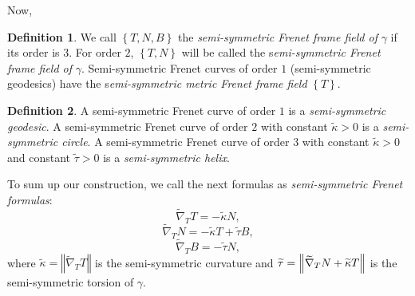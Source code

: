 \documentclass{amsart}
\theoremstyle{plain}
\theoremstyle{definition}
\newtheorem{definition}{Definition}
\theoremstyle{remark}
\numberwithin{equation}{section}
\begin{document}
Now,

\begin{definition}
We call $\left\{ T,N,B\right\} $ the \textit{semi-symmetric Frenet frame
field of} $\gamma $ if its order is $3$. For order $2$, $\left\{ T,N\right\} 
$ will be called the s\textit{emi-symmetric Frenet frame field of} $\gamma .$
Semi-symmetric Frenet curves of order $1$ (semi-symmetric geodesics) have
the s\textit{emi-symmetric metric Frenet frame field }$\left\{ T\right\} .$
\end{definition}

\begin{definition}
A semi-symmetric Frenet curve of order $1$ is a \textit{semi-symmetric
geodesic}. A semi-symmetric Frenet curve of order $2$ with constant $%
\widetilde{\kappa }>0$ is a \textit{semi-symmetric circle}. A semi-symmetric
Frenet curve of order $3$ with constant $\widetilde{\kappa }>0$ and constant 
$\widetilde{\tau }>0$ is a \textit{semi-symmetric helix}.
\end{definition}

To sum up our construction, we call the next formulas as \textit{%
semi-symmetric Frenet formulas}:%
\begin{equation*}
\widetilde{\nabla }_{T}T=-\widetilde{\kappa }N,
\end{equation*}%
\begin{equation*}
\widetilde{\nabla }_{T}N=-\widetilde{\kappa }T+\widetilde{\tau }B,
\end{equation*}%
\begin{equation*}
\widetilde{\nabla }_{T}B=-\widetilde{\tau }N,
\end{equation*}%
where $\widetilde{\kappa }=\left\Vert \widetilde{\nabla }_{T}T\right\Vert $
is the semi-symmetric curvature and $\widetilde{\tau }=\left\Vert \widetilde{%
\nabla }_{T}N+\widetilde{\kappa }T\right\Vert $ is the semi-symmetric
torsion of $\gamma .$
\end{document}

